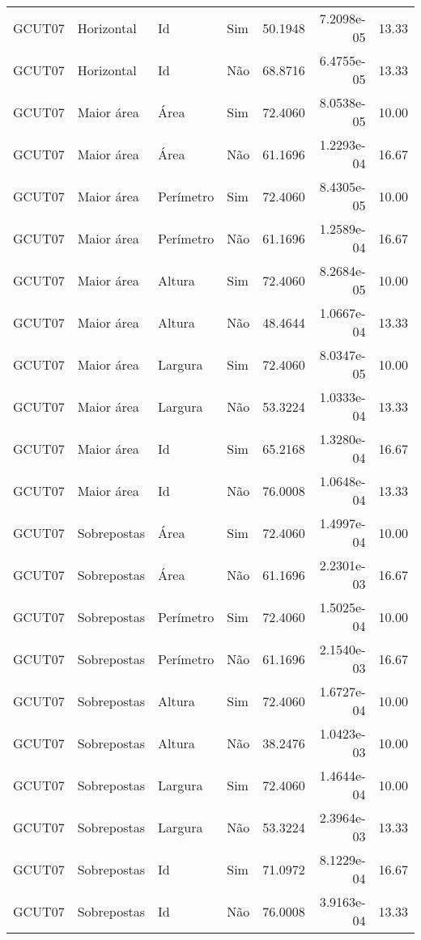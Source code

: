 \begin{tabular}{llllrrr}
    GCUT07    & Horizontal  & Id        & Sim         & 50.1948      & 7.2098e-05 & 13.33    \\
    GCUT07    & Horizontal  & Id        & Não         & 68.8716      & 6.4755e-05 & 13.33    \\
    GCUT07    & Maior área  & Área      & Sim         & 72.4060      & 8.0538e-05 & 10.00    \\
    GCUT07    & Maior área  & Área      & Não         & 61.1696      & 1.2293e-04 & 16.67    \\
    GCUT07    & Maior área  & Perímetro & Sim         & 72.4060      & 8.4305e-05 & 10.00    \\
    GCUT07    & Maior área  & Perímetro & Não         & 61.1696      & 1.2589e-04 & 16.67    \\
    GCUT07    & Maior área  & Altura    & Sim         & 72.4060      & 8.2684e-05 & 10.00    \\
    GCUT07    & Maior área  & Altura    & Não         & 48.4644      & 1.0667e-04 & 13.33    \\
    GCUT07    & Maior área  & Largura   & Sim         & 72.4060      & 8.0347e-05 & 10.00    \\
    GCUT07    & Maior área  & Largura   & Não         & 53.3224      & 1.0333e-04 & 13.33    \\
    GCUT07    & Maior área  & Id        & Sim         & 65.2168      & 1.3280e-04 & 16.67    \\
    GCUT07    & Maior área  & Id        & Não         & 76.0008      & 1.0648e-04 & 13.33    \\
    GCUT07    & Sobrepostas & Área      & Sim         & 72.4060      & 1.4997e-04 & 10.00    \\
    GCUT07    & Sobrepostas & Área      & Não         & 61.1696      & 2.2301e-03 & 16.67    \\
    GCUT07    & Sobrepostas & Perímetro & Sim         & 72.4060      & 1.5025e-04 & 10.00    \\
    GCUT07    & Sobrepostas & Perímetro & Não         & 61.1696      & 2.1540e-03 & 16.67    \\
    GCUT07    & Sobrepostas & Altura    & Sim         & 72.4060      & 1.6727e-04 & 10.00    \\
    GCUT07    & Sobrepostas & Altura    & Não         & 38.2476      & 1.0423e-03 & 10.00    \\
    GCUT07    & Sobrepostas & Largura   & Sim         & 72.4060      & 1.4644e-04 & 10.00    \\
    GCUT07    & Sobrepostas & Largura   & Não         & 53.3224      & 2.3964e-03 & 13.33    \\
    GCUT07    & Sobrepostas & Id        & Sim         & 71.0972      & 8.1229e-04 & 16.67    \\
    GCUT07    & Sobrepostas & Id        & Não         & 76.0008      & 3.9163e-04 & 13.33    \\
    \hline
\end{tabular}